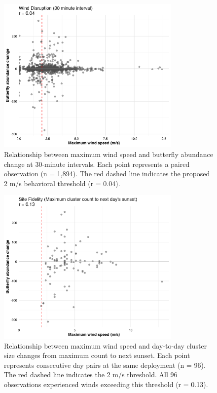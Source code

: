 \begin{figure}[htbp]
    \centering
    \includegraphics[width=0.8\textwidth]{supplemental/results/30_min/figures/wind_vs_change_bivariate_untransformed.png}
    \caption{Relationship between maximum wind speed and butterfly abundance change at 30-minute intervals. Each point represents a paired observation (n = 1,894). The red dashed line indicates the proposed 2 m/s behavioral threshold (r = 0.04).}
    \label{fig:wind_bivariate_30min}
\end{figure}

\begin{figure}[htbp]
    \centering
    \includegraphics[width=0.8\textwidth]{supplemental/results/sunset/figures/wind_vs_change_bivariate_untransformed.png}
    \caption{Relationship between maximum wind speed and day-to-day cluster size changes from maximum count to next sunset. Each point represents consecutive day pairs at the same deployment (n = 96). The red dashed line indicates the 2 m/s threshold. All 96 observations experienced winds exceeding this threshold (r = 0.13).}
    \label{fig:wind_bivariate_sunset}
\end{figure}

